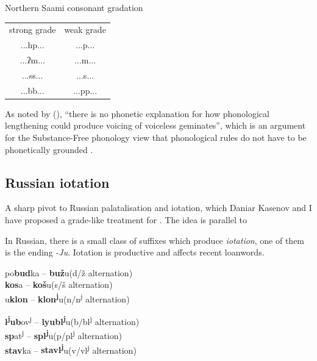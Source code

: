 \documentclass[a4paper, 12pt]{article}
\newcommand{\citeay}[2][]{\citeauthor{#2} (\citeyear[#1]{#2})}
\begin{document}
	\ex\label{norsaami}Northern Saami consonant gradation \parencite[p. 19]{balsbaal2007}\\
\begin{tabular}{cc}
strong grade & weak grade \\
...hp...           & ...p...          \\
...ʔm...           & ...m...          \\
...ss...           & ...s...          \\
...bb...           & ...pp...        
\end{tabular}
	\xe
	As noted by \citeay[p. 141]{chabot2021}, ``there is no phonetic explanation for how phonological lengthening could produce voicing of voiceless geminates'', which is an argument for the Substance-Free phonology view that phonological rules do not have to be phonetically grounded \parencite{hale-reiss2008}.
	
			\subsection{Russian iotation}
			
	A sharp pivot to Russian palatalisation and iotation, which Daniar Kasenov and I have proposed a grade-like treatment for \parencite{shikunova-kasenov2023}. The idea is parallel to 
	
	In Russian, there is a small class of suffixes which produce \emph{iotation}, one of them is the {\Fsg} ending \emph{-Ju}. Iotation is productive and affects recent loanwords.
	
\begin{minipage}[t]{0.45\linewidth}
	\ex\label{ex:exes}po\textbf{bud}ka -- \textbf{buž}u\hfill(d/ž alternation)\\
		\textbf{kos}a -- \textbf{koš}u\hfill (s/š alternation)\\
		u\textbf{klon}  -- \textbf{klon\textsuperscript{j}}u\hfill(n/n\textsuperscript{j} alternation)
	\xe
\end{minipage}
\hfill
\begin{minipage}[t]{0.45\linewidth}
	\ex\label{ex:exes-end}\textbf{l\textsuperscript{j}ub}ov\textsuperscript{j} -- \textbf{lyubl\textsuperscript{j}}u\hfill(b/bl\textsuperscript{j}  alternation)\\
		\textbf{sp}at\textsuperscript{j}  -- \textbf{spl\textsuperscript{j}}u\hfill(p/pl\textsuperscript{j}  alternation)\\
		\textbf{stav}ka  -- \textbf{stavl\textsuperscript{j}}u\hfill(v/vl\textsuperscript{j}  alternation)
	\xe
\end{minipage}
\end{document}
